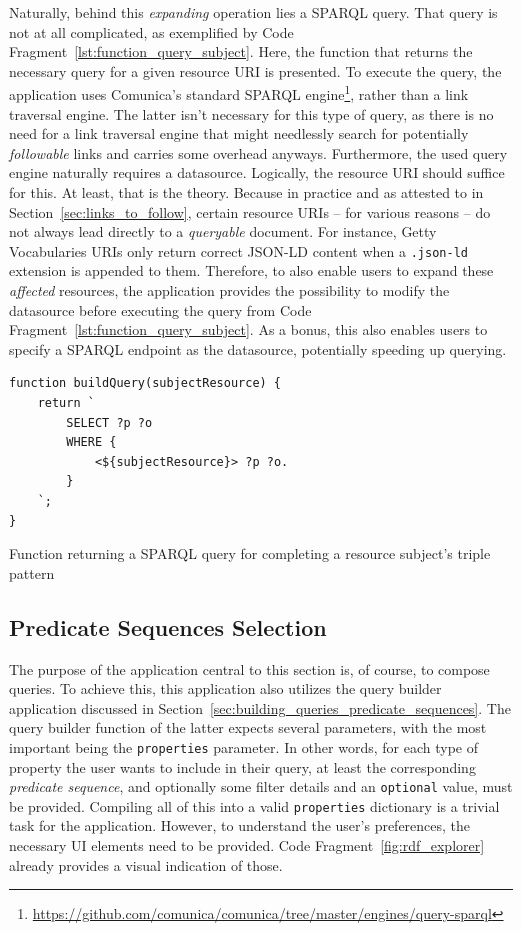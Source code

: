 Naturally, behind this \textit{expanding} operation lies a SPARQL query. That query is not at all complicated, as exemplified by Code Fragment~\ref{lst:function_query_subject}. Here, the function that returns the necessary query for a given resource URI is presented. To execute the query, the application uses Comunica's standard SPARQL engine\footnote{\url{https://github.com/comunica/comunica/tree/master/engines/query-sparql}}, rather than a link traversal engine. The latter isn't necessary for this type of query, as there is no need for a link traversal engine that might needlessly search for potentially \textit{followable} links and carries some overhead anyways. Furthermore, the used query engine naturally requires a datasource. Logically, the resource URI should suffice for this. At least, that is the theory. Because in practice and as attested to in Section~\ref{sec:links_to_follow}, certain resource URIs – for various reasons – do not always lead directly to a \textit{queryable} document. For instance, Getty Vocabularies URIs only return correct JSON-LD content when a \texttt{.json-ld} extension is appended to them. Therefore, to also enable users to expand these \textit{affected} resources, the application provides the possibility to modify the datasource before executing the query from Code Fragment~\ref{lst:function_query_subject}. As a bonus, this also enables users to specify a SPARQL endpoint as the datasource, potentially speeding up querying.

\begin{listing}[htbp]
    \begin{verbatim}
function buildQuery(subjectResource) {
    return `
        SELECT ?p ?o
        WHERE {
            <${subjectResource}> ?p ?o.
        }
    `;
}
    \end{verbatim}
    \caption{Function returning a SPARQL query for completing a resource subject's triple pattern}
    \label{lst:function_query_subject}
\end{listing}

\subsection{Predicate Sequences Selection}

The purpose of the application central to this section is, of course, to compose queries. To achieve this, this application also utilizes the query builder application discussed in Section~\ref{sec:building_queries_predicate_sequences}. The query builder function of the latter expects several parameters, with the most important being the \texttt{properties} parameter. In other words, for each type of property the user wants to include in their query, at least the corresponding \textit{predicate sequence}, and optionally some filter details and an \texttt{optional} value, must be provided. Compiling all of this into a valid \texttt{properties} dictionary is a trivial task for the application. However, to understand the user's preferences, the necessary UI elements need to be provided. Code Fragment~\ref{fig:rdf_explorer} already provides a visual indication of those.

